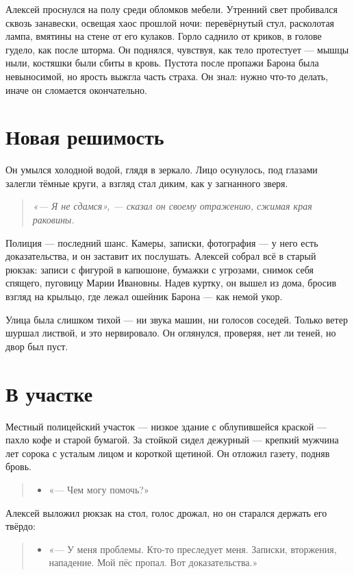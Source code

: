 \documentclass[12pt,a4paper]{book}
\newenvironment{dialogue}{\begin{quote}\itshape\begin{itemize}\item[]}{\end{itemize}\end{quote}}
\newenvironment{innerthought}{\begin{quote}\small\itshape}{\end{quote}}
\begin{document}
Алексей проснулся на полу среди обломков мебели. Утренний свет пробивался сквозь занавески, освещая хаос прошлой ночи: перевёрнутый стул, расколотая лампа, вмятины на стене от его кулаков. Горло саднило от криков, в голове гудело, как после шторма. Он поднялся, чувствуя, как тело протестует — мышцы ныли, костяшки были сбиты в кровь. Пустота после пропажи Барона была невыносимой, но ярость выжгла часть страха. Он знал: нужно что-то делать, иначе он сломается окончательно.

\section{Новая решимость}

Он умылся холодной водой, глядя в зеркало. Лицо осунулось, под глазами залегли тёмные круги, а взгляд стал диким, как у загнанного зверя. 

\begin{innerthought}
«— Я не сдамся», — сказал он своему отражению, сжимая края раковины.
\end{innerthought}

Полиция — последний шанс. Камеры, записки, фотография — у него есть доказательства, и он заставит их послушать. Алексей собрал всё в старый рюкзак: записи с фигурой в капюшоне, бумажки с угрозами, снимок себя спящего, пуговицу Марии Ивановны. Надев куртку, он вышел из дома, бросив взгляд на крыльцо, где лежал ошейник Барона — как немой укор.

Улица была слишком тихой — ни звука машин, ни голосов соседей. Только ветер шуршал листвой, и это нервировало. Он оглянулся, проверяя, нет ли теней, но двор был пуст.

\section{В участке}

Местный полицейский участок — низкое здание с облупившейся краской — пахло кофе и старой бумагой. За стойкой сидел дежурный — крепкий мужчина лет сорока с усталым лицом и короткой щетиной. Он отложил газету, подняв бровь.

\begin{dialogue}
«— Чем могу помочь?»
\end{dialogue}

Алексей выложил рюкзак на стол, голос дрожал, но он старался держать его твёрдо:

\begin{dialogue}
«— У меня проблемы. Кто-то преследует меня. Записки, вторжения, нападение. Мой пёс пропал. Вот доказательства.»
\end{dialogue}
\end{document}
